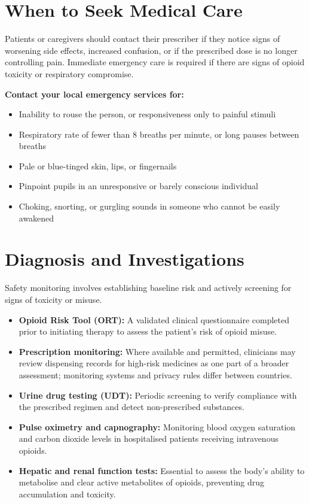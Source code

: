 \section*{When to Seek Medical Care}
Patients or caregivers should contact their prescriber if they notice signs of worsening side effects, increased confusion, or if the prescribed dose is no longer controlling pain. Immediate emergency care is required if there are signs of opioid toxicity or respiratory compromise.

\textbf{Contact your local emergency services for:}
\begin{itemize}
    \item Inability to rouse the person, or responsiveness only to painful stimuli
    \item Respiratory rate of fewer than 8 breaths per minute, or long pauses between breaths
    \item Pale or blue-tinged skin, lips, or fingernails
    \item Pinpoint pupils in an unresponsive or barely conscious individual
    \item Choking, snorting, or gurgling sounds in someone who cannot be easily awakened
\end{itemize}

\section*{Diagnosis and Investigations}
Safety monitoring involves establishing baseline risk and actively screening for signs of toxicity or misuse.
\begin{itemize}
    \item \textbf{Opioid Risk Tool (ORT):} A validated clinical questionnaire completed prior to initiating therapy to assess the patient's risk of opioid misuse.
    \item \textbf{Prescription monitoring:} Where available and permitted, clinicians may review dispensing records for high-risk medicines as one part of a broader assessment; monitoring systems and privacy rules differ between countries.
    \item \textbf{Urine drug testing (UDT):} Periodic screening to verify compliance with the prescribed regimen and detect non-prescribed substances.
    \item \textbf{Pulse oximetry and capnography:} Monitoring blood oxygen saturation and carbon dioxide levels in hospitalised patients receiving intravenous opioids.
    \item \textbf{Hepatic and renal function tests:} Essential to assess the body's ability to metabolise and clear active metabolites of opioids, preventing drug accumulation and toxicity.
\end{itemize}

